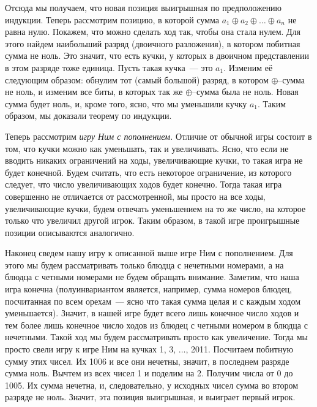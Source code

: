 Отсюда мы получаем, что новая позиция выигрышная по предположению индукции.
Теперь рассмотрим позицию, в которой сумма
$a_1 \oplus a_2 \oplus \ldots \oplus a_n$ не равна нулю.
Покажем, что можно сделать ход так, чтобы она стала нулем.
Для этого найдем наибольший разряд (двоичного разложения), в котором побитная
сумма не ноль.
Это значит, что есть кучки, у которых в двоичном представлении в этом разряде
тоже единица.
Пусть такая кучка~--- это $a_1$.
Изменим её следующим образом: обнулим тот (самый большой) разряд, в котором
$\oplus$--сумма не ноль, и изменим все биты, в которых так же $\oplus$--сумма
была не ноль.
Новая сумма будет ноль, и, кроме того, ясно, что мы уменьшили кучку $a_1$.
Таким образом, мы доказали теорему по индукции.
\par
Теперь рассмотрим \emph{игру Ним с пополнением.}
Отличие от обычной игры состоит в том, что кучки можно как уменьшать, так и
увеличивать.
Ясно, что если не вводить никаких ограничений на ходы, увеличивающие кучки, то
такая игра не будет конечной.
Будем считать, что есть некоторое ограничение, из которого следует, что число
увеличивающих ходов будет конечно.
Тогда такая игра совершенно не отличается от рассмотренной, мы просто на все
ходы, увеличивающие кучки, будем отвечать уменьшением на то же число, на
которое только что увеличил другой игрок.
Таким образом, в такой игре проигрышные позиции описываются аналогично.
\par
Наконец сведем нашу игру к описанной выше игре Ним с пополнением.
Для этого мы будем рассматривать только блюдца с нечетными номерами, а на
блюдца с четными номерами не будем обращать внимание.
Заметим, что наша игра конечна
(полуинвариантом является, например, сумма номеров блюдец, посчитанная по всем
орехам~--- ясно что такая сумма целая и с каждым ходом уменьшается).
Значит, в нашей игре будет всего лишь конечное число ходов и тем более лишь
конечное число ходов из блюдец с четными номером в блюдца с нечетными.
Такой ход мы будем рассматривать просто как увеличение.
Тогда мы просто свели игру к игре Ним на кучках 1, 3, $\ldots$, 2011.
Посчитаем побитную сумму этих чисел.
Их 1006 и все они нечетны, значит, в последнем разряде сумма ноль.
Вычтем из всех чисел 1 и поделим на 2.
Получим числа от 0 до 1005.
Их сумма нечетна, и, следовательно, у исходных чисел сумма во втором разряде
не ноль.
Значит, эта позиция выигрышная, и выиграет первый игрок.
\endproblem
